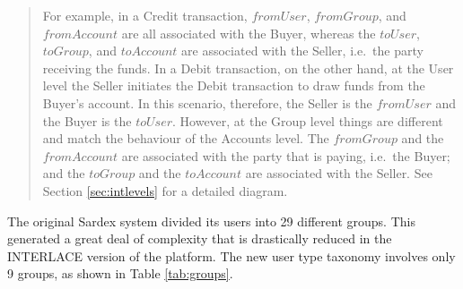 \begin{quote}
\vspace{-0.3cm}
\small
For example, in a Credit transaction, $fromUser$, $fromGroup$, and $fromAccount$ are all associated with the Buyer, whereas the $toUser$, $toGroup$, and $toAccount$ are associated with the Seller, i.e.\ the party receiving the funds. In a Debit transaction, on the other hand, at the User level the Seller initiates the Debit transaction to draw funds from the Buyer's account. In this scenario, therefore, the Seller is the $fromUser$ and the Buyer is the $toUser$. However, at the Group level things are different and match the behaviour of the Accounts level. The $fromGroup$ and the $fromAccount$ are associated with the party that is paying, i.e.\ the Buyer; and the $toGroup$ and the $toAccount$ are associated with the Seller. See Section \ref{sec:intlevels} for a detailed diagram.
\vspace{-0.3cm}
\end{quote}

The original Sardex system divided its users into 29 different groups. This generated a great deal of complexity that is drastically reduced in the INTERLACE version of the platform. The new user type taxonomy involves only 9 groups, as shown in Table \ref{tab:groups}.

